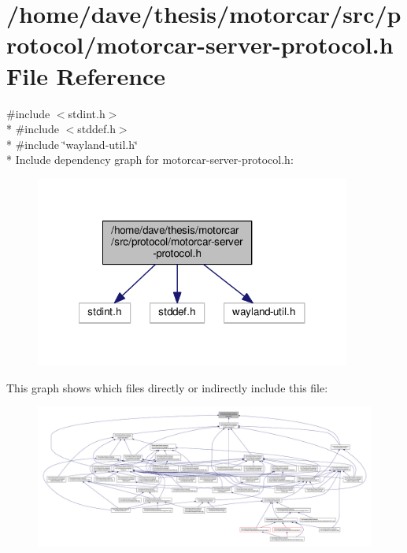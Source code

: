 \hypertarget{motorcar-server-protocol_8h}{\section{/home/dave/thesis/motorcar/src/protocol/motorcar-\/server-\/protocol.h File Reference}
\label{motorcar-server-protocol_8h}
}
{\ttfamily \#include $<$stdint.\-h$>$}\\*
{\ttfamily \#include $<$stddef.\-h$>$}\\*
{\ttfamily \#include \char`\"{}wayland-\/util.\-h\char`\"{}}\\*
Include dependency graph for motorcar-\/server-\/protocol.h\-:
\nopagebreak
\begin{figure}[H]
\begin{center}
\leavevmode
\includegraphics[width=294pt]{motorcar-server-protocol_8h__incl}
\end{center}
\end{figure}
This graph shows which files directly or indirectly include this file\-:
\nopagebreak
\begin{figure}[H]
\begin{center}
\leavevmode
\includegraphics[width=350pt]{motorcar-server-protocol_8h__dep__incl}
\end{center}
\end{figure}

